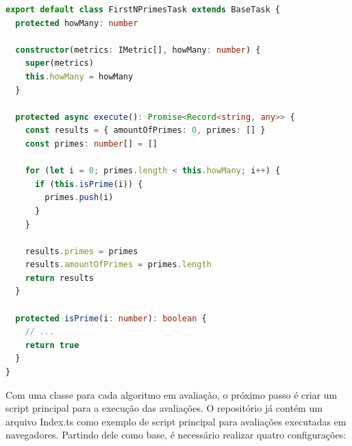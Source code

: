 \documentclass[12pt]{tcc}
\begin{document}
\begin{lstlisting}[label={lst:elc_firstnprimes_task}, caption={Exemplo de classe encapulando um algoritmo de cálculo de números primos.}, language=TypeScript, breaklines=true]
export default class FirstNPrimesTask extends BaseTask {
  protected howMany: number

  constructor(metrics: IMetric[], howMany: number) {
    super(metrics)
    this.howMany = howMany
  }

  protected async execute(): Promise<Record<string, any>> {
    const results = { amountOfPrimes: 0, primes: [] }
    const primes: number[] = []

    for (let i = 0; primes.length < this.howMany; i++) {
      if (this.isPrime(i)) {
        primes.push(i)
      }
    }

    results.primes = primes
    results.amountOfPrimes = primes.length
    return results
  }

  protected isPrime(i: number): boolean {
    // ...
    return true
  }
}
\end{lstlisting}

	Com uma classe para cada algoritmo em avaliação, o próximo passo é criar um script principal para a execução das avaliações.
	O repositório já contém um arquivo Index.ts como exemplo de script principal para avaliações executadas em navegadores.
	Partindo dele como base, é necessário realizar quatro configurações:
\end{document}
